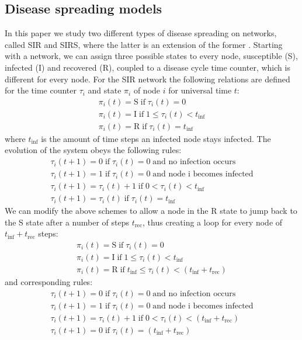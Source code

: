 \documentclass[10pt,a4paper]{article}
\begin{document}
\subsection{Disease spreading models}
\noindent In this paper we study two different types of disease spreading on networks, called SIR and SIRS, where the latter is an extension of the former \cite{paper1}. Starting with a network, we can assign three possible states to every node, susceptible (S), infected (I) and recovered (R), coupled to a disease cycle time counter, which is different for every node. For the SIR network the following relations are defined for the time counter $\tau_{i}$ and state $\pi_{i}$ of node $i$ for universal time $t$:
\begin{eqnarray}
\pi_{i}(t) = \text{S} \; \text{if} \; \tau_{i}(t) = 0 \\
\pi_{i}(t) = \text{I} \; \text{if} \; 1 \leq \tau_{i}(t) < t_{\text{inf}} \\
\pi_{i}(t) = \text{R} \; \text{if} \; \tau_{i}(t) = t_{\text{inf}} 
\end{eqnarray}
where $t_{\text{inf}}$ is the amount of time steps an infected node stays infected. The evolution of the system obeys the following rules:
\begin{eqnarray}
\tau_{i}(t+1) = 0 \; \text{if} \; \tau_{i}(t) = 0 \; \text{and no infection occurs}\\
\tau_{i}(t+1) = 1 \; \text{if} \; \tau_{i}(t) = 0 \; \text{and node i becomes infected}\\
\tau_{i}(t+1) = \tau_{i}(t) + 1 \; \text{if} \; 0 < \tau_{i}(t) < t_{\text{inf}}\\
\tau_{i}(t+1) = \tau_{i}(t) \; \text{if} \; \tau_{i}(t) = t_{\text{inf}}
\end{eqnarray}
We can modify the above schemes to allow a node in the R state to jump back to the S state after a number of steps $t_{\text{rec}}$, thus creating a loop for every node of $t_{\text{inf}} + t_{\text{rec}}$ steps:
\begin{eqnarray}
\pi_{i}(t) = \text{S} \; \text{if} \; \tau_{i}(t) = 0 \\
\pi_{i}(t) = \text{I} \; \text{if} \; 1 \leq \tau_{i}(t) < t_{\text{inf}} \\
\pi_{i}(t) = \text{R} \; \text{if} \; t_{\text{inf}} \leq \tau_{i}(t) < (t_{\text{inf}} + t_{\text{rec}}) 
\end{eqnarray}
and corresponding rules:
\begin{eqnarray}
\tau_{i}(t+1) = 0 \; \text{if} \; \tau_{i}(t) = 0 \; \text{and no infection occurs}\\
\tau_{i}(t+1) = 1 \; \text{if} \; \tau_{i}(t) = 0 \; \text{and node i becomes infected}\\
\tau_{i}(t+1) = \tau_{i}(t) + 1 \; \text{if} \; 0 < \tau_{i}(t) < (t_{\text{inf}} + t_{\text{rec}})\\
\tau_{i}(t+1) = 0 \; \text{if} \; \tau_{i}(t) = (t_{\text{inf}} + t_{\text{rec}})
\end{eqnarray}
\end{document}
